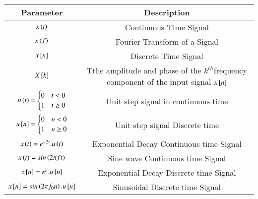 \begin{tabular}{|c|c|}
\hline
Parameter & Description \\
\hline
$x\left(t\right)$  & Continuous Time  Signal\\
\hline
$x\left(f\right)$ & Fourier Transform of a Signal \\
\hline
$x{}\left[n\right]$ & Discrete Time Signal\\
\hline
$X{}\left[k\right]$ &  Tthe amplitude and phase of the $k^{th}$frequency component of the input signal $x{}\left[n\right]$\\
\hline
$u\left(t\right)= \begin{cases}  0 & t<0\\ 1 & t\geq0 \end{cases}$ & Unit step signal in continuous time\\
\hline
$u{}\left[n\right]= \begin{cases}  0 & n<0\\ 1 & n\geq0 \end{cases}$ & Unit step signal Discrete time \\
\hline
$x\left(t\right)= e^{-2t}.u\left(t\right)$ & Exponential Decay Continuous time Signal\\
\hline
$x\left(t\right)=sin\left(2\pi ft\right)$ & Sine wave Continuous time Signal\\
\hline
$x{}\left[n\right]=e^{n}.u{}\left[n\right] $& Exponential Decay Discrete time Signal\\
\hline
$x{}\left[n\right]= sin\left(2\pi f_0 n\right).u{}\left[n\right]$ & Sinusoidal Discrete time Signal\\
\hline
\end{tabular}